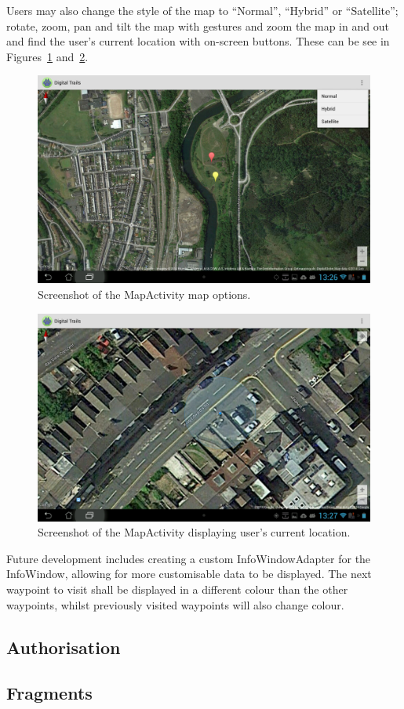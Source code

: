 \documentclass[11pt,a4paper]{article}
\begin{document}
Users may also change the style of the map to ``Normal'', ``Hybrid'' or ``Satellite''; rotate, zoom, pan and tilt the map with gestures and zoom the map in and out and find the user's current location with on-screen buttons. These can be see in Figures~\ref{fig:mapOptions} and~\ref{fig:userLocation}.

\begin{figure}[H]
\centering
\includegraphics[angle=90, width=.6\linewidth]{mapOptions.jpg}
\caption{Screenshot of the MapActivity map options.}
\label{fig:mapOptions}
\end{figure}

\begin{figure}[H]
\centering
\includegraphics[angle=90, width=.6\linewidth]{userLocation.jpg}
\caption{Screenshot of the MapActivity displaying user's current location.}
\label{fig:userLocation}
\end{figure}

Future development includes creating a custom InfoWindowAdapter for the InfoWindow, allowing for more customisable data to be displayed. The next waypoint to visit shall be displayed in a different colour than the other waypoints, whilst previously visited waypoints will also change colour. 


\subsection{Authorisation}
\label{sec:authorisation}

\subsection{Fragments}
\label{sec:fragments}
\end{document}
